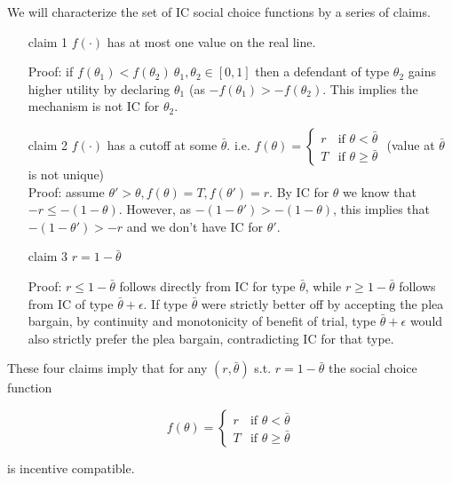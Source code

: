 \documentclass[a4paper]{article}
\begin{document}
We will characterize the set of IC social choice functions by a series of claims. 

\begin{itemize}
	\item[claim 1] $f(\cdot)$ has at most one value on the real line.
	
	Proof: if $f(\theta_1)<f(\theta_2) ~\theta_1,\theta_2 \in [0,1]$ then a defendant of type $\theta_2$ gains higher utility by declaring $\theta_1$ (as $-f(\theta_1)>-f(\theta_2)$. This implies the mechanism is not IC for $\theta_2$.
	
	\item[claim 2] $f(\cdot)$ has a cutoff at some $\bar{\theta}$. i.e. $f(\theta)= \begin{cases} r & \text{if } \theta<\bar{\theta}
		\\
		T & \text{if } \theta\geq\bar{\theta} \end{cases}$ (value at $\bar{\theta}$ is not unique)\\
	
	Proof: assume $\theta'>\theta , f(\theta)=T, f(\theta')=r$. By IC for $\theta$ we know that $-r\leq -(1-\theta)$. However, as $-(1-\theta')>-(1-\theta)$, this implies that $-(1-\theta')>-r$ and we don't have IC for $\theta'$.
	
	\item[claim 3] $r= 1-\bar{\theta}$
	
	Proof: $r\leq 1-\bar{\theta}$ follows directly from IC for type $\bar{\theta}$, while $r\geq 1-\bar{\theta}$ follows from IC of type $\bar{\theta}+\epsilon$. If type $\bar{\theta}$ were strictly better off by accepting the plea bargain, by continuity and monotonicity of benefit of trial, type $\bar{\theta}+\epsilon$ would also strictly prefer the plea bargain, contradicting IC for that type.
\end{itemize}

These four claims  imply that for any $(r,\bar{\theta})$ s.t. $r= 1-\bar{\theta}$ the social choice function

\[ f(\theta)= \begin{cases} r & \text{if } \theta<\bar{\theta} \\
	
	T & \text{if } \theta\geq\bar{\theta} \end{cases} \]

is incentive compatible.

\fi
\end{document}
